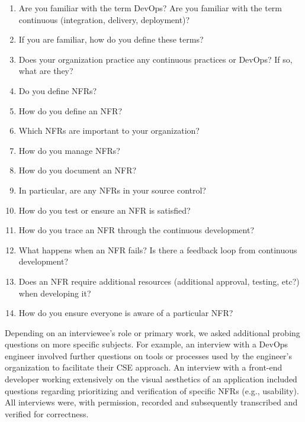 \documentclass[smallextended]{svjour3}
\begin{document}
\begin{enumerate}
\item Are you familiar with the term DevOps? Are you familiar with the term continuous (integration, delivery, deployment)?
\item If you are familiar, how do you define these terms?
\item  Does your organization practice any continuous practices or DevOps? If so, what are they?
\item Do you define NFRs? 
\item How do you define an NFR?
\item Which NFRs are important to your organization?
\item How do you manage NFRs?
\item How do you document an NFR?
\item In particular, are any NFRs in your source control?
\item How do you test or ensure an NFR is satisfied?
\item How do you trace an NFR through the continuous development?
\item What happens when an NFR fails? Is there a feedback loop from continuous development?
\item Does an NFR require additional resources (additional approval, testing, etc?) when developing it?
\item How do you ensure everyone is aware of a particular NFR?
\end{enumerate}

Depending on an interviewee's role or primary work, we asked additional probing questions on more specific subjects. 
For example, an interview with a DevOps engineer involved further questions on tools or processes used by the engineer's organization to facilitate their CSE approach. 
An interview with a front-end developer working extensively on the visual aesthetics of an application included questions regarding prioritizing and verification of specific NFRs (e.g., usability).
All interviews were, with permission, recorded and subsequently transcribed and verified for correctness.
\end{document}
